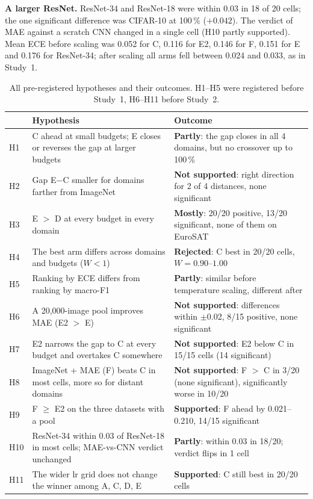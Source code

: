 \documentclass[conference]{IEEEtran}
\begin{document}
\textbf{A larger ResNet.} ResNet-34 and ResNet-18 were within 0.03 in 18 of 20 cells; the one significant
difference was CIFAR-10 at 100\,\% ($+0.042$). The verdict of MAE against a scratch CNN changed in a single cell (H10
partly supported). Mean ECE before scaling was 0.052 for C, 0.116 for E2, 0.146 for F, 0.151 for E and 0.176 for
ResNet-34; after scaling all arms fell between 0.024 and 0.033, as in Study~1.

\begin{table}[t]
\centering
\caption{All pre-registered hypotheses and their outcomes. H1--H5 were registered before Study~1, H6--H11 before
Study~2.}
\label{tab:hyp}
\footnotesize
\begin{tabular}{@{}lp{7.2cm}p{8.6cm}@{}}
\toprule
 & Hypothesis & Outcome \\
\midrule
H1 & C ahead at small budgets; E closes or reverses the gap at larger budgets &
\textbf{Partly}: the gap closes in all 4 domains, but no crossover up to 100\,\% \\
H2 & Gap E$-$C smaller for domains farther from ImageNet &
\textbf{Not supported}: right direction for 2 of 4 distances, none significant \\
H3 & E $>$ D at every budget in every domain &
\textbf{Mostly}: 20/20 positive, 13/20 significant, none of them on EuroSAT \\
H4 & The best arm differs across domains and budgets ($W < 1$) &
\textbf{Rejected}: C best in 20/20 cells, $W = 0.90$--$1.00$ \\
H5 & Ranking by ECE differs from ranking by macro-F1 &
\textbf{Partly}: similar before temperature scaling, different after \\
\midrule
H6 & A 20,000-image pool improves MAE (E2 $>$ E) &
\textbf{Not supported}: differences within $\pm$0.02, 8/15 positive, none significant \\
H7 & E2 narrows the gap to C at every budget and overtakes C somewhere &
\textbf{Not supported}: E2 below C in 15/15 cells (14 significant) \\
H8 & ImageNet + MAE (F) beats C in most cells, more so for distant domains &
\textbf{Not supported}: F $>$ C in 3/20 (none significant), significantly worse in 10/20 \\
H9 & F $\geq$ E2 on the three datasets with a pool &
\textbf{Supported}: F ahead by 0.021--0.210, 14/15 significant \\
H10 & ResNet-34 within 0.03 of ResNet-18 in most cells; MAE-vs-CNN verdict unchanged &
\textbf{Partly}: within 0.03 in 18/20; verdict flips in 1 cell \\
H11 & The wider lr grid does not change the winner among A, C, D, E &
\textbf{Supported}: C still best in 20/20 cells \\
\bottomrule
\end{tabular}
\end{table}
\end{document}
